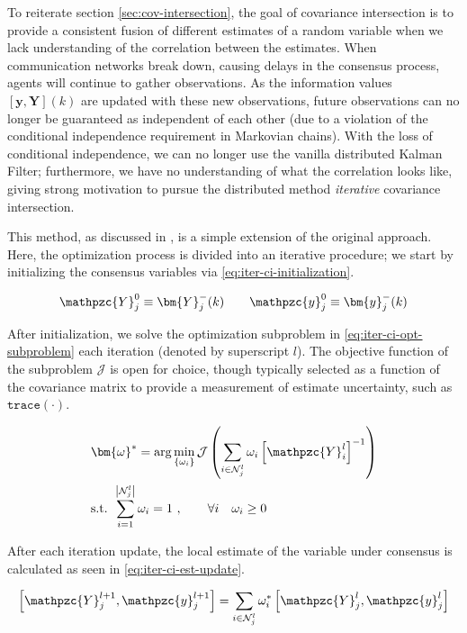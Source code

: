 To reiterate section \ref{sec:cov-intersection}, the goal of covariance intersection is to provide a consistent fusion of different estimates of a random variable when we lack understanding of the correlation between the estimates. When communication networks break down, causing delays in the consensus process, agents will continue to gather observations. As the information values $\left[\bm{y},\bm{Y}\right](k)$ are updated with these new observations, future observations can no longer be guaranteed as independent of each other (due to a violation of the conditional independence requirement in Markovian chains). With the loss of conditional independence, we can no longer use the vanilla distributed Kalman Filter; furthermore, we have no understanding of what the correlation looks like, giving strong motivation to pursue the distributed method \textit{iterative} covariance intersection.

This method, as discussed in \cite{wang2012distributed}, is a simple extension of the original approach. Here, the optimization process is divided into an iterative procedure; we start by initializing the consensus variables via \eqref{eq:iter-ci-initialization}.

\begin{equation}
    \mathpzc{Y}_j^0\equiv\bm{Y}_j^-(k) \qquad \mathpzc{y}_j^0\equiv\bm{y}_j^-(k)
    \label{eq:iter-ci-initialization}
\end{equation}

After initialization, we solve the optimization subproblem in \eqref{eq:iter-ci-opt-subproblem} each iteration (denoted by superscript $l$). The objective function of the subproblem $\mathcal{J}$ is open for choice, though typically selected as a function of the covariance matrix to provide a measurement of estimate uncertainty, such as $\texttt{trace}(\cdot)$.

\begin{align}
    &\bm{\omega}^*=\arg\min_{\left\{\omega_i\right\}}\mathcal{J}\left(\sum_{i\in\mathcal{N}_j^l}\omega_i\left[\mathpzc{Y}_i^l\right]^{-1}\right) \nonumber \\
    &\text{s.t. }\sum_{i=1}^{\left|\mathcal{N}_j^l\right|}\omega_i=1\ , \qquad\forall i \quad \omega_i \geq 0
    \label{eq:iter-ci-opt-subproblem}
\end{align}

After each iteration update, the local estimate of the variable under consensus is calculated as seen in \eqref{eq:iter-ci-est-update}.

\begin{equation}
    \left[\mathpzc{Y}_j^{l+1},\mathpzc{y}_j^{l+1}\right]=\sum_{i\in\mathcal{N}_j^l}\omega^*_i\left[\mathpzc{Y}_j^l,\mathpzc{y}_j^l\right]
    \label{eq:iter-ci-est-update}
\end{equation}

